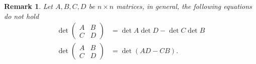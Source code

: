 \documentclass[11pt]{book}
\newtheorem{remark}{Remark}[section]
\theoremstyle{definition}
\numberwithin{equation}{subsection}
\begin{document}
\begin{remark}
Let $A,B,C,D$ be $n\times n$ matrices, in general, the following equations do not hold
\begin{align*}
    \det \left(
    \begin{matrix}
        A & B\\
        C & D
    \end{matrix}
    \right) & = \det A \det D - \det C \det B \\
    \det \left(
    \begin{matrix}
        A & B\\
        C & D
    \end{matrix}
    \right)& = \det(AD - CB).
\end{align*}
\end{remark}

\medskip
\end{document}
